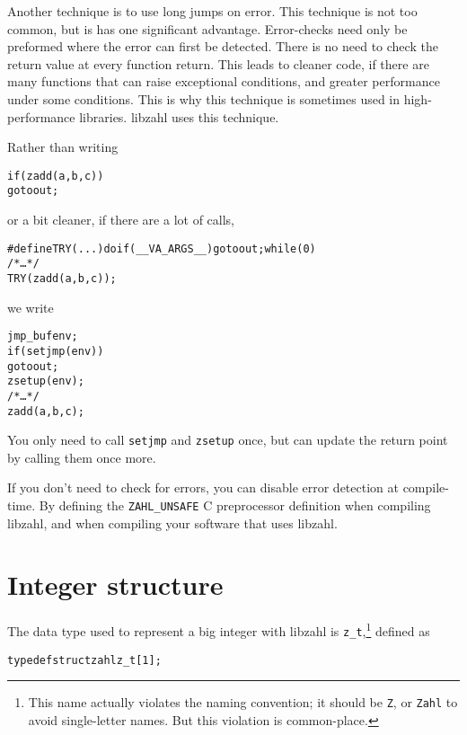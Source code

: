 Another technique is to use long jumps on error.
This technique is not too common, but is has one
significant advantage. Error-checks need only be
preformed where the error can first be detected.
There is no need to check the return value at every
function return. This leads to cleaner code, if
there are many functions that can raise exceptional
conditions, and greater performance under some
conditions. This is why this technique is sometimes
used in high-performance libraries. libzahl uses
this technique.

Rather than writing

\begin{alltt}
   if (zadd(a, b, c))
       goto out;
\end{alltt}

\noindent
or a bit cleaner, if there are a lot of calls,

\begin{alltt}
   #define TRY(...) do if (__VA_ARGS__) goto out; while (0)
   \textcolor{c}{/* \textrm{\ldots} */}
   TRY(zadd(a, b, c));
\end{alltt}

\noindent
we write

\begin{alltt}
   jmp_buf env;
   if (setjmp(env))
       goto out;
   zsetup(env);
   \textcolor{c}{/* \textrm{\ldots} */}
   zadd(a, b, c);
\end{alltt}

You only need to call {\tt setjmp} and {\tt zsetup}
once, but can update the return point by calling
them once more.

If you don't need to check for errors, you can
disable error detection at compile-time. By defining
the {\tt ZAHL\_UNSAFE} C preprocessor definition
when compiling libzahl, and when compiling your
software that uses libzahl.


\newpage
\section{Integer structure}
\label{sec:Integer structure}

The data type used to represent a big integer with
libzahl is {\tt z\_t},\footnote{This name actually
violates the naming convention; it should be {\tt Z},
or {\tt Zahl} to avoid single-letter names. But this
violation is common-place.} defined as

\begin{alltt}
   typedef struct zahl z_t[1];
\end{alltt}

